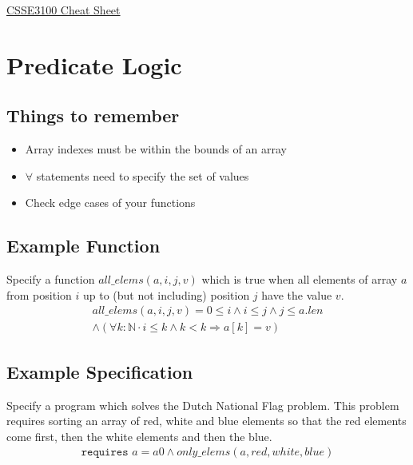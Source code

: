 \documentclass[landscape]{cheat}
\begin{document}
\footnotesize
\begin{multicols*}{3}

\begin{center}
\Large{\underline{CSSE3100 Cheat Sheet}} \\
\end{center}

\section{Predicate Logic}

\subsection{Things to remember}
\begin{itemize}
    \item Array indexes must be within the bounds of an array
    \item $\forall$ statements need to specify the set of values
    \item Check edge cases of your functions
\end{itemize}

\subsection{Example Function}
Specify a function $all\_elems(a, i, j, v)$ which is true when all elements of array $a$ from position $i$ up to (but not including) position $j$ have the value $v$.
\begin{multline*}
all\_elems(a, i, j, v) =
    0 \leq i
    \land i \leq j
    \land j \leq a.len \\
    \land (\forall k : \mathbb{N} \cdot
        i \leq k
        \land k < k
        \Rightarrow a[k] = v
    )
\end{multline*}

\subsection{Example Specification}
Specify a program which solves the Dutch National Flag problem.
This problem requires sorting an array of red, white and blue elements so that the red elements come first, then the white elements and then the blue.
\begin{multline*}
\texttt{requires } a = a0 \land only\_elems(a, red, white, blue) \\
\end{multline*}


\end{multicols*}
\end{document}
